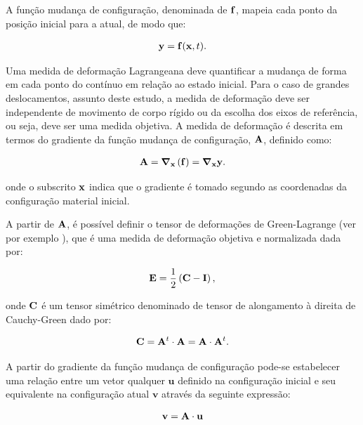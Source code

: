 A função mudança de configuração, denominada de $\mathbf{f}$, mapeia cada ponto da posição inicial para a atual, de modo que:

\begin{align}
	\mathbf{y} = \mathbf{f}(\mathbf{x},t).
\end{align}

Uma medida de deformação Lagrangeana deve quantificar a mudança de forma em cada ponto do contínuo em relação ao estado inicial. Para o caso de grandes deslocamentos, assunto deste estudo, a medida de deformação deve ser independente de movimento de corpo rígido ou da escolha dos eixos de referência, ou seja, deve ser uma medida objetiva. A medida de deformação é descrita em termos do gradiente da função mudança de configuração, $\mathbf{A}$, definido como:

\begin{align}
	\mathbf{A} = \boldsymbol{\nabla}_{\mathbf{x}}\left(\mathbf{f}\right) = \boldsymbol{\nabla}_{\mathbf{x}}\mathbf{y}.
\end{align}

\noindent onde o subscrito $\mathbf{x}$ indica que o gradiente é tomado segundo as coordenadas da configuração material inicial.

A partir de $\mathbf{A}$, é possível definir o tensor de deformações de Green-Lagrange (ver por exemplo ), que é uma medida de deformação objetiva e normalizada dada por: 

\begin{align}
\mathbf{E} = \frac{1}{2}\left(\mathbf{C} - \mathbf{I}\right),
\end{align}

\noindent onde $\mathbf{C}$ é um tensor simétrico denominado de tensor de alongamento à direita de Cauchy-Green dado por:

\begin{align}
\mathbf{C} = \mathbf{A}^{t} \cdot \mathbf{A} =  \mathbf{A} \cdot \mathbf{A}^{t}.
\end{align}

A partir do gradiente da função mudança de configuração pode-se estabelecer uma relação entre um vetor qualquer $\mathbf{u}$ definido na configuração inicial e seu equivalente na configuração atual $\mathbf{v}$ através da seguinte expressão:

\begin{align}
\mathbf{v} = \mathbf{A} \cdot \mathbf{u} \label{eq:rel_vet}
\end{align}

